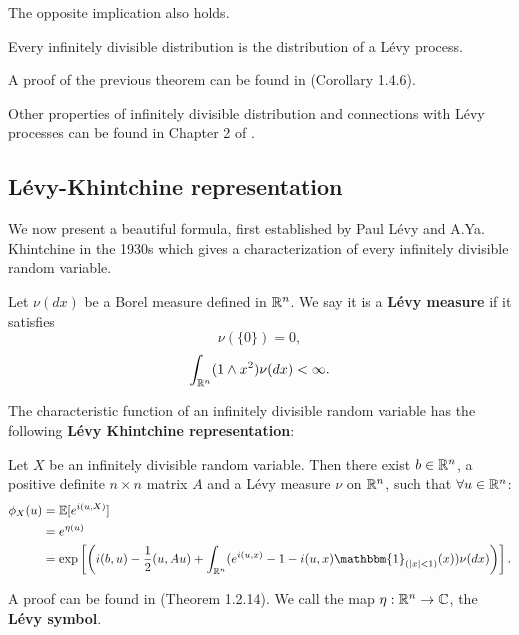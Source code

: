 The opposite implication also holds. 
\begin{Theorem}
Every infinitely divisible distribution is the distribution of a Lévy process. 
\end{Theorem}
A proof of the previous theorem can be found in \cite{Applebaum} (Corollary 1.4.6).

Other properties of infinitely divisible distribution and connections with Lévy processes can be found in Chapter 2 of \cite{Sato}.\\

\subsection{Lévy-Khintchine representation}

We now present a beautiful formula, first established by Paul Lévy and A.Ya. Khintchine in the 1930s
which gives a characterization of every infinitely divisible random variable.\\

\begin{Definition} \label{Levy_measure}
Let $\nu(dx)$ be a Borel measure defined in $\mathbb{R}^n$. We say it is a \textbf{Lévy measure} if it satisfies
\begin{equation}
 \nu (\{ 0 \} ) = 0,
\end{equation}
\begin{equation} \label{Levy_m}
 \int_{\mathbb{R}^n} (1\wedge x^2) \nu(dx) < \infty.
\end{equation}
\end{Definition}
The characteristic function of an infinitely divisible random variable has the following \textbf{Lévy Khintchine representation}:
\begin{Theorem}
 Let $X$ be an infinitely divisible random variable. Then there exist $b\in \mathbb{R}^n$, a positive definite $n\times n$ matrix $A$
 and a Lévy measure $\nu$ on $\mathbb{R}^n$, such that $\forall u \in \mathbb{R}^n$:
\begin{align}
\phi_X(u)  &= \mathbb{E} [e^{i(u,X)}]  \\ 
	   &= e^{\eta(u)} \nonumber \\
	   &= \exp \left[ \left( i(b,u) - \frac{1}{2}(u,Au) + \int_{\R^n} 
	   ( e^{i(u,x)} -1 -i(u,x) \mathbbm{1}_{(|x|<1)}(x) ) \nu(dx) \right) \right]. \nonumber		      
\end{align}
\end{Theorem}
A proof can be found in \cite{Applebaum} (Theorem 1.2.14).
We call the map $\eta : \mathbb{R}^n \to \mathbb{C}$, the \textbf{Lévy symbol}.

